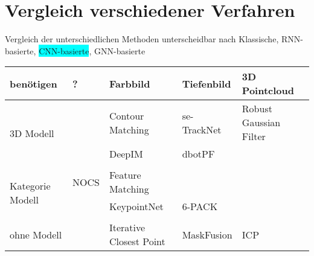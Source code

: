 \documentclass[a4paper, 11pt]{article}
\begin{document}
\section{Vergleich verschiedener Verfahren}
Vergleich der unterschiedlichen Methoden unterscheidbar nach \colorbox{Mahogany}{Klassische}, \colorbox{YellowOrange}{RNN-basierte}, \colorbox{Cyan}{CNN-basierte}, \colorbox{OliveGreen}{GNN-basierte}
\begin{table}
    \centering
    \begin{tabular}{p{1.5cm}|l|l|l|l}
        benötigen                             & ?                                     & Farbbild                                          & Tiefenbild                                        & 3D Pointcloud                               \\\hline
        \multirow{3}{1.5cm}{3D Modell}        &                                       & Contour Matching                                  & se-TrackNet\cite{se-TrackNet}                     & Robust Gaussian Filter\cite{GaussianFilter} \\
                                              &                                       & DeepIM\cite{Deepim}                               & dbotPF\cite{dbotPF}                               &                                             \\
                                              &                                       &                                                   &                                                   &                                             \\\hline
        \multirow{3}{1.5cm}{Kategorie Modell} & NOCS\cite{NormalizedObjectCoordiante} & Feature Matching                                  &                                                   &                                             \\
                                              &                                       & KeypointNet\cite{KeypointNet}                     & 6-PACK\cite{6pack}                                &                                             \\
                                              &                                       &                                                   &                                                   &                                             \\\hline
        \multirow{3}{1.5cm}{ohne Modell}      &                                       & Iterative Closest Point                           & MaskFusion\cite{MaskFusion}                       & ICP\cite{ICP}                               \\

\end{tabular}
\end{table}
\end{document}
